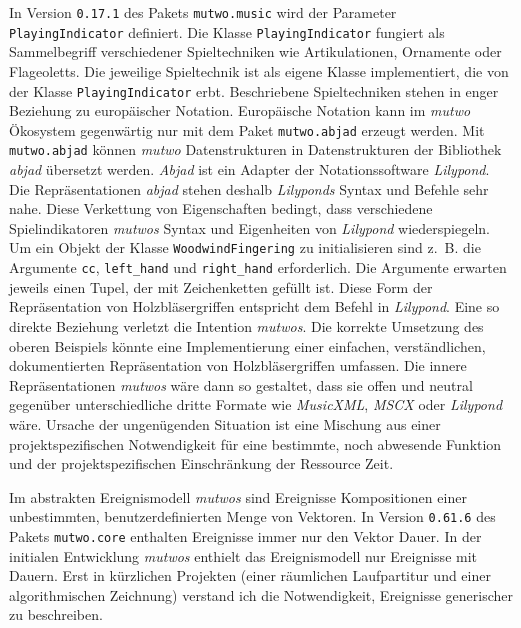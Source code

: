 \documentclass[12pt,a4paper,ngerman]{article}
\begin{document}
\smallskip

In Version \texttt{0.17.1} des Pakets \texttt{mutwo.music} wird der Parameter \texttt{PlayingIndicator} definiert.
Die Klasse \texttt{PlayingIndicator} fungiert als Sammelbegriff verschiedener Spieltechniken wie Artikulationen, Ornamente oder Flageoletts.
Die jeweilige Spieltechnik ist als eigene Klasse implementiert, die von der Klasse \texttt{PlayingIndicator} erbt.
Beschriebene Spieltechniken stehen in enger Beziehung zu europäischer Notation.
Europäische Notation kann im \emph{mutwo} Ökosystem gegenwärtig nur mit dem Paket \texttt{mutwo.abjad} erzeugt werden.
Mit \texttt{mutwo.abjad} können \emph{mutwo} Datenstrukturen in Datenstrukturen der Bibliothek \emph{abjad} übersetzt werden.
\emph{Abjad} ist ein Adapter der Notationssoftware \emph{Lilypond}.
Die Repräsentationen \emph{abjad} stehen deshalb \emph{Lilyponds} Syntax und Befehle sehr nahe.
Diese Verkettung von Eigenschaften bedingt, dass verschiedene Spielindikatoren \emph{mutwos} Syntax und Eigenheiten von \emph{Lilypond} wiederspiegeln.
Um ein Objekt der Klasse \texttt{WoodwindFingering} zu initialisieren sind z.~B. die Argumente \texttt{cc}, \texttt{left\_hand} und \texttt{right\_hand} erforderlich.
Die Argumente erwarten jeweils einen Tupel, der mit Zeichenketten gefüllt ist.
Diese Form der Repräsentation von Holzbläsergriffen entspricht dem Befehl in \emph{Lilypond}. 
Eine so direkte Beziehung verletzt die Intention \emph{mutwos}.
Die korrekte Umsetzung des oberen Beispiels könnte eine Implementierung einer einfachen, verständlichen, dokumentierten Repräsentation von Holzbläsergriffen umfassen.
Die innere Repräsentationen \emph{mutwos} wäre dann so gestaltet, dass sie offen und neutral gegenüber unterschiedliche dritte Formate wie \emph{MusicXML}, \emph{MSCX} oder \emph{Lilypond} wäre.
Ursache der ungenügenden Situation ist eine Mischung aus einer projektspezifischen Notwendigkeit für eine bestimmte, noch abwesende Funktion und der projektspezifischen Einschränkung der Ressource Zeit.

\smallskip

Im abstrakten Ereignismodell \emph{mutwos} sind Ereignisse Kompositionen einer unbestimmten, benutzerdefinierten Menge von Vektoren.
In Version \texttt{0.61.6} des Pakets \texttt{mutwo.core} enthalten Ereignisse immer nur den Vektor Dauer.
In der initialen Entwicklung \emph{mutwos} enthielt das Ereignismodell nur Ereignisse mit Dauern.
Erst in kürzlichen Projekten (einer räumlichen Laufpartitur und einer algorithmischen Zeichnung) verstand ich die Notwendigkeit, Ereignisse generischer zu beschreiben.
\end{document}
